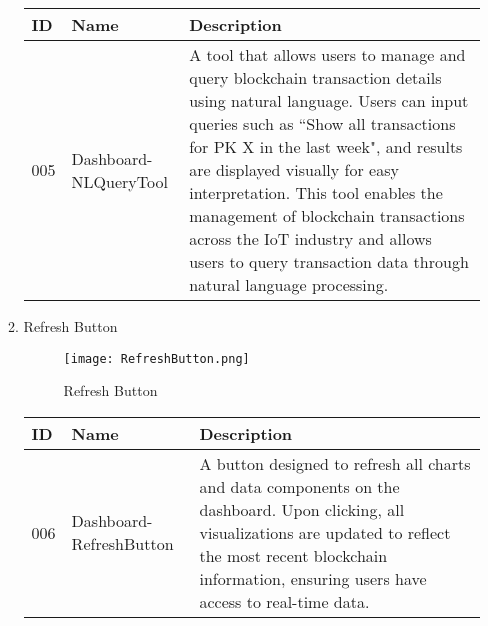 \documentclass[conference]{IEEEtran}
\begin{document}
\begin{enumerate}[itemsep=2ex, parsep=1ex]
\begin{enumerate}[itemsep=2ex, parsep=1ex]
	      	      \begin{table}[h!]
	      	      	\def\arraystretch{1.24} \small
	      	      	\begin{tabular}{|p{1.2cm}|p{2.5cm}|p{4.0cm}|}
	      	      		\hline
	      	      		ID  & Name                  & Description                                                                                                                                                                                                                                                                                                                                                                                                             \\
	      	      		\hline
	      	      		005 & Dashboard-NLQueryTool & A tool that allows users to manage and query blockchain transaction details using natural language. Users can input queries such as ``Show all transactions for PK X in the last week", and results are displayed visually for easy interpretation. This tool enables the management of blockchain transactions across the IoT industry and allows users to query transaction data through natural language processing. \\
	      	      		\hline
	      	      	\end{tabular}
	      	      \end{table}
	      	      	      	      
	      	\item Refresh Button

            \begin{figure}[h!]
                \centering
                \texttt{[image: RefreshButton.png]}
                \caption{Refresh Button}
                \label{fig:enter-label}
            \end{figure}
            
	      	      \begin{table}[h!]
	      	      	\def\arraystretch{1.24} \small
	      	      	\begin{tabular}{|p{1.2cm}|p{2.5cm}|p{4.0cm}|}
	      	      		\hline
	      	      		ID  & Name                    & Description                                                                                                                                                                                                                  \\
	      	      		\hline
	      	      		006 & Dashboard-RefreshButton & A button designed to refresh all charts and data components on the dashboard. Upon clicking, all visualizations are updated to reflect the most recent blockchain information, ensuring users have access to real-time data. \\
	      	      		\hline
	      	      	\end{tabular}
	      	      \end{table}
	      \end{enumerate}
	      	      

\end{enumerate}
\end{document}
